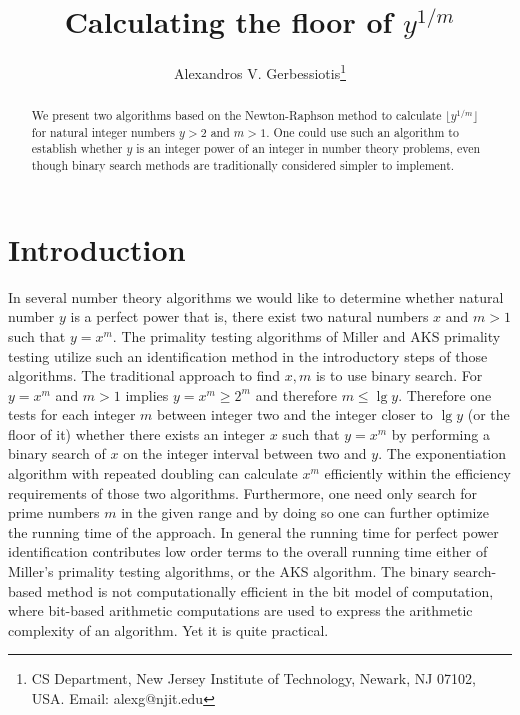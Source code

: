 \documentclass[11pt]{article}
\begin{document}
\title{Calculating the floor of $y^{1/m}$}

\author{Alexandros V. Gerbessiotis\thanks{CS Department, New Jersey Institute of Technology, 
Newark, NJ 07102, USA. Email: alexg@njit.edu}
}
\maketitle
\thispagestyle{empty}


\begin{abstract}
We present two algorithms based on the Newton-Raphson method
to calculate $\lfloor y^{1/m} \rfloor$ for natural integer numbers
$y>2$ and $m >1$. One could use such an algorithm to establish
whether $y$ is an integer power of an integer in number theory
problems, even though binary search methods are traditionally
considered simpler to implement.
\end{abstract}



\section{Introduction}

In several number theory algorithms we would like to determine
whether natural number $y$ is a perfect power that is, there
exist two natural numbers $x$ and $m>1$ such that $y= x^m$.
The primality testing algorithms of Miller \cite{M76} \cite{R80} and
AKS primality testing \cite{AKS} utilize such an 
identification method in the introductory steps of those
algorithms.  
The traditional approach to find $x,m$ is to use binary search.
For $y=x^m $ and $m>1$ implies $y=x^m \geq 2^m$ and therefore
$m \leq \lg{y}$. Therefore one tests for each integer  $m$ 
between integer two and the integer closer to $\lg{y}$ 
(or the floor of it) whether there exists an integer
$x$ such that  $y=x^m$ by performing a  binary search of $x$ 
on the integer interval between two and $y$. The exponentiation
algorithm with  repeated doubling can calculate $x^m$ 
efficiently within  the efficiency requirements of those 
two algorithms.
Furthermore, one need  only search for prime numbers $m$ 
in the given range and by doing so one can  further optimize 
the running time of the approach. 
In general the running time for perfect power
identification contributes low order terms to the overall
running time either of Miller's primality testing algorithms,
or the AKS algorithm.
The binary search-based method is not computationally efficient 
in the bit model of computation,
where bit-based arithmetic computations are used to express the
arithmetic complexity of an algorithm. Yet it is quite practical.
\end{document}
